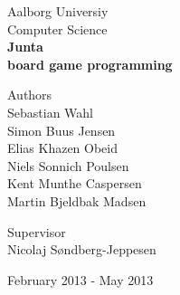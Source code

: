 \begin{titlingpage}
\begin{center}

\vspace*{1.0cm}

\LARGE Aalborg Universiy\\[0.75cm]
\Large Computer Science\\[1.75cm]

\vspace{1.0cm}
{ \fontsize{80.2pt}{80.2pt} \bfseries {} Junta \\}
\vspace{0.15cm}
{ \fontsize{35.2pt}{35.2pt} \bfseries {} board game programming}
\vspace{2.5cm}

\begin{minipage}{13.37cm}
  \begin{flushleft} \large
    \vspace{0pt}
    {\small Authors } \\
    \vspace{0.5cm}
    Sebastian Wahl\\
    Simon Buus Jensen\\
    Elias Khazen Obeid\\
    Niels Sonnich Poulsen\\
    Kent Munthe Caspersen\\
    Martin Bjeldbak Madsen\\
  \end{flushleft}

  \begin{flushright} \large
    \vspace{-120pt}
    {\small Supervisor}\\
    \vspace{0.5cm}
    Nicolaj Søndberg-Jeppesen
  \end{flushright}
\end{minipage}

\vfill

{\large February 2013 - May 2013}
\end{center}
\end{titlingpage}
